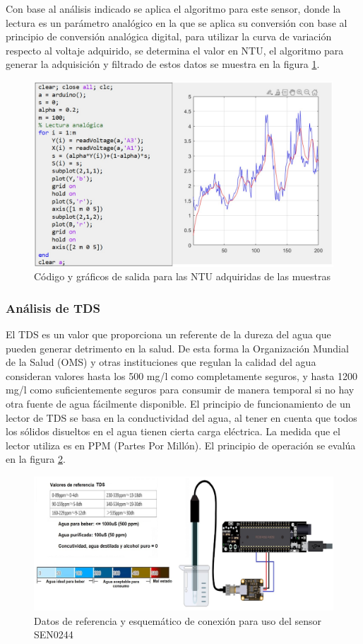 \documentclass[conference]{IEEEtran}
\begin{document}
	
Con base al análisis indicado se aplica el algoritmo para este sensor, donde la lectura es un parámetro analógico en la que se aplica su conversión con base al principio de conversión analógica digital, para utilizar la curva de variación respecto al voltaje adquirido, se determina el valor en NTU, el algoritmo para generar la adquisición y filtrado de estos datos se muestra en la figura \ref{fig:13}.

\begin{figure}[htbp]
	\centering
	\includegraphics[width=0.8\columnwidth]{fig13.jpg}
	\caption{Código y gráficos de salida para las NTU adquiridas de las muestras}
	\label{fig:13}
\end{figure}

\subsubsection{Análisis de TDS}

El TDS es un valor que proporciona un referente de la dureza del agua que pueden generar detrimento en la salud. De esta forma la Organización Mundial de la Salud (OMS) y otras instituciones que regulan la calidad del agua consideran valores hasta los 500 mg/l como completamente seguros, y hasta 1200 mg/l como suficientemente seguros para consumir de manera temporal si no hay otra fuente de agua fácilmente disponible. El principio de funcionamiento de un lector de TDS se basa en la conductividad del agua, al tener en cuenta que todos los sólidos disueltos en el agua tienen cierta carga eléctrica. La medida que el lector utiliza es en PPM (Partes Por Millón). El principio de operación se evalúa en la figura \ref{fig:14}.

\begin{figure}[htbp]
	\centering
	\includegraphics[width=0.8\columnwidth]{fig14.jpg}
	\caption{Datos de referencia y esquemático de conexión para uso del sensor SEN0244}
	\label{fig:14}
\end{figure}
\end{document}
